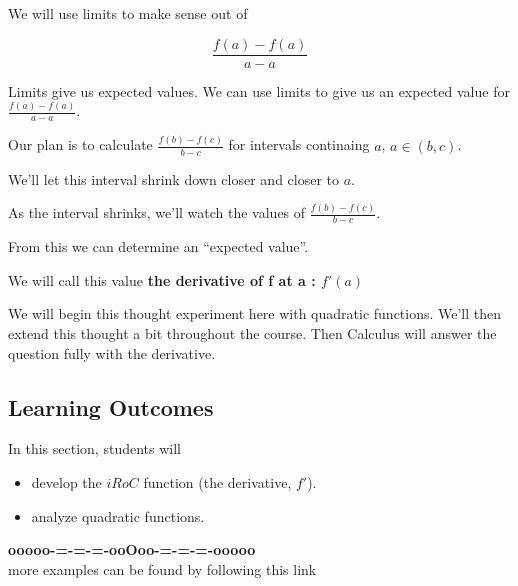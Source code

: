 \documentclass{ximera}
\begin{document}
We will use limits to make sense out of 


\[
\frac{f(a) - f(a)}{a-a}
\]




Limits give us expected values. We can use limits to give us an expected value for $\frac{f(a) - f(a)}{a-a}$.



Our plan is to calculate $\frac{f(b) - f(c)}{b-c}$ for intervals continaing $a$, $a \in (b,c)$.

We'll let this interval shrink down closer and closer to $a$.

As the interval shrinks, we'll watch the values of $\frac{f(b) - f(c)}{b-c}$.

From this we can determine an ``expected value''.


We will call this value \textbf{the derivative of f at a : $f'(a)$}






















We will begin this thought experiment here with quadratic functions. We'll then extend this thought a bit throughout the course. Then Calculus will answer the question fully with the derivative.















\subsection*{Learning Outcomes}

\begin{sectionOutcomes}
In this section, students will 

\begin{itemize}
\item develop the $iRoC$ function (the derivative, $f'$).
\item analyze quadratic functions.
\end{itemize}
\end{sectionOutcomes}










\begin{center}
\textbf{\textcolor{green!50!black}{ooooo-=-=-=-ooOoo-=-=-=-ooooo}} \\

more examples can be found by following this link\\ 

\end{center}
\end{document}
